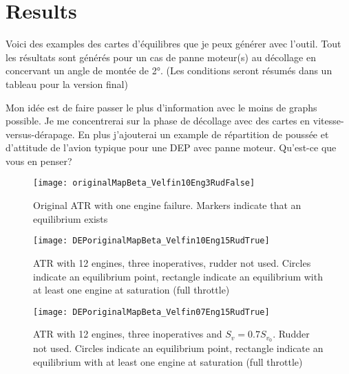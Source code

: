 \section{Results}

Voici des examples des cartes d'équilibres que je peux générer avec l'outil. Tout les résultats sont générés pour un cas de panne moteur(s) au décollage en concervant un angle de montée de 2°. (Les conditions seront résumés dans un tableau pour la version final)

Mon idée est de faire passer le plus d'information avec le moins de graphs possible. Je me concentrerai sur la phase de décollage avec des cartes en vitesse-versus-dérapage. En plus j'ajouterai un example de répartition de poussée et d'attitude de l'avion typique pour une DEP avec panne moteur. Qu'est-ce que vous en penser?

\begin{figure}[hbt!]
	\centering
		\texttt{[image: originalMapBeta\_Velfin10Eng3RudFalse]}
		\caption{Original ATR with one engine failure. Markers indicate that an equilibrium exists}
		\label{fig:originalfin1_3engine}
\end{figure}

\begin{figure}[hbt!]
		\centering
		\texttt{[image: DEPoriginalMapBeta\_Velfin10Eng15RudTrue]}
		\caption{ATR with 12 engines, three inoperatives, rudder not used. Circles indicate an equilibrium point, rectangle indicate an equilibrium with at least one engine at saturation (full throttle)}
		\label{fig:DEPoriginalfin1_15engine}
\end{figure}

\begin{figure}[hbt!]
	\centering
	\texttt{[image: DEPoriginalMapBeta\_Velfin07Eng15RudTrue]}
	\caption{ATR with 12 engines, three inoperatives and $S_v=0.7S_{v_0}$. Rudder not used. Circles indicate an equilibrium point, rectangle indicate an equilibrium with at least one engine at saturation (full throttle)}
	\label{fig:DEPoriginalfin07_15engine}
\end{figure}